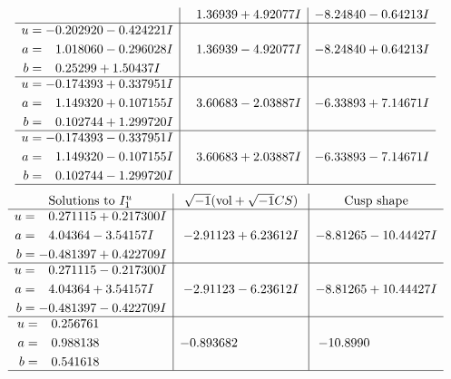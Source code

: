 \documentclass[1p]{elsarticle_modified}
\theoremstyle{definition}
\newcommand{\I}{\sqrt{-1}}
\begin{document}
$$\begin{array}{c|c|c}
 & \phantom{-}1.36939 + 4.92077 I & -8.24840 - 0.64213 I \\ \hline\begin{aligned}
u &= -0.202920 - 0.424221 I \\
a &= \phantom{-}1.018060 - 0.296028 I \\
b &= \phantom{-}0.25299 + 1.50437 I\end{aligned}
 & \phantom{-}1.36939 - 4.92077 I & -8.24840 + 0.64213 I \\ \hline\begin{aligned}
u &= -0.174393 + 0.337951 I \\
a &= \phantom{-}1.149320 + 0.107155 I \\
b &= \phantom{-}0.102744 + 1.299720 I\end{aligned}
 & \phantom{-}3.60683 - 2.03887 I & -6.33893 + 7.14671 I \\ \hline\begin{aligned}
u &= -0.174393 - 0.337951 I \\
a &= \phantom{-}1.149320 - 0.107155 I \\
b &= \phantom{-}0.102744 - 1.299720 I\end{aligned}
 & \phantom{-}3.60683 + 2.03887 I & -6.33893 - 7.14671 I\\
 \hline 
 \end{array}$$\newpage$$\begin{array}{c|c|c}  
\text{Solutions to }I^u_{1}& \I (\text{vol} + \sqrt{-1}CS) & \text{Cusp shape}\\
 \hline 
\begin{aligned}
u &= \phantom{-}0.271115 + 0.217300 I \\
a &= \phantom{-}4.04364 - 3.54157 I \\
b &= -0.481397 + 0.422709 I\end{aligned}
 & -2.91123 + 6.23612 I & -8.81265 - 10.44427 I \\ \hline\begin{aligned}
u &= \phantom{-}0.271115 - 0.217300 I \\
a &= \phantom{-}4.04364 + 3.54157 I \\
b &= -0.481397 - 0.422709 I\end{aligned}
 & -2.91123 - 6.23612 I & -8.81265 + 10.44427 I \\ \hline\begin{aligned}
u &= \phantom{-}0.256761\phantom{ +0.000000I} \\
a &= \phantom{-}0.988138\phantom{ +0.000000I} \\
b &= \phantom{-}0.541618\phantom{ +0.000000I}\end{aligned}
 & -0.893682\phantom{ +0.000000I} & -10.8990\phantom{ +0.000000I}\\
 \hline 
 \end{array}$$\newpage\newpage\renewcommand{\arraystretch}{1}
\end{document}
